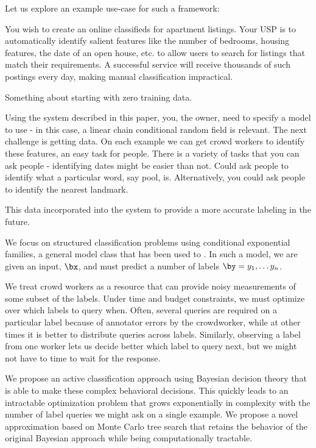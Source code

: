 Let us explore an example use-case for such a framework:
\begin{example*}
  You wish to create an online classifieds for apartment listings. 
  Your USP is to automatically identify salient features like the number of bedrooms, housing features, the date of an open house, etc. to allow users to search for listings that match their requirements.
  A successful service will receive thousands of such postings every day, making manual classification impractical.

  Something about starting with zero training data.

  Using the system described in this paper, you, the owner, need to specify a model to use - in this case, a linear chain conditional random field is relevant.
  The next challenge is getting data. 
  On each example we can get crowd workers to identify these features, an easy task for people.
  There is a variety of tasks that you can ask people - identifying dates might be easier than not. 
  Could ask people to identify what a particular word, say pool, is.
  Alternatively, you could ask people to identify the nearest landmark.

  This data incorporated into the system to provide a more accurate labeling in the future.
\end{example*}

We focus on structured classification problems using conditional exponential families, a general model class that has been used to . In such a model, we are given an input, $\bx$, and must predict a number of labels $\by = y_1, \ldots y_n$.

We treat crowd workers as a resource that can provide noisy measurements of some subset of the labels.
Under time and budget constraints, we must optimize over which labels to query when. 
Often, several queries are required on a particular label because of annotator errors by the crowdworker, while at other times it is better to distribute queries across labels.
Similarly, observing a label from one worker lets us decide better which label to query next, but we might not have to time to wait for the response.

We propose an active classification approach using Bayesian decision theory that is able to make these complex behavioral decisions.
This quickly leads to an intractable optimization problem that grows exponentially in complexity with the number of label queries we might ask on a single example.
We propose a novel approximation based on Monte Carlo tree search that retains the behavior of the original Bayesian approach while being computationally tractable.

